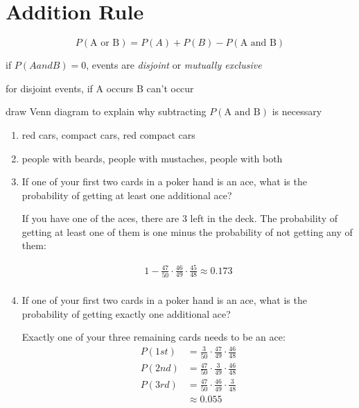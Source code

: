 \documentclass[letterpaper, landscape]{exam}
\begin{document}
  \section{Addition Rule}

  \[
    P(\text{A or B}) = P(A) + P(B) - P(\text{A and B})
  \]

  \begin{itemize*}
    \item if $P(A and B) = 0$, events are {\em disjoint\/} or 
      {\em mutually exclusive\/}
    \item for disjoint events, if A occurs B can't occur
    \item draw Venn diagram to explain why subtracting $P(\text{A and B})$ is
      necessary
  \end{itemize*}

  \begin{enumerate}
    \item red cars, compact cars, red compact cars

    \item people with beards, people with mustaches, people with both

    \item If one of your first two cards in a poker hand is an ace, what is the
      probability of getting at least one additional ace?

      \begin{solution}
        If you have one of the aces, there are 3 left in the deck. The
        probability of getting at least one of them is one minus the probability
        of not getting any of them:

        \begin{align*}
          1 - \frac{47}{50} \cdot \frac{46}{49} \cdot \frac{45}{48} \approx 0.173 \\
        \end{align*}
      \end{solution}

    \item If one of your first two cards in a poker hand is an ace, what is the
      probability of getting exactly one additional ace?

      \begin{solution}
        Exactly one of your three remaining cards needs to be an ace:
        \begin{align*}
          P(1st) & = \frac{3}{50} \cdot \frac{47}{49} \cdot \frac{46}{48} \\
          P(2nd) & = \frac{47}{50} \cdot \frac{3}{49} \cdot \frac{46}{48} \\
          P(3rd) & = \frac{47}{50} \cdot \frac{46}{49} \cdot \frac{3}{48} \\
                 & \approx 0.055
        \end{align*}


\end{solution}
\end{enumerate}
\end{document}
